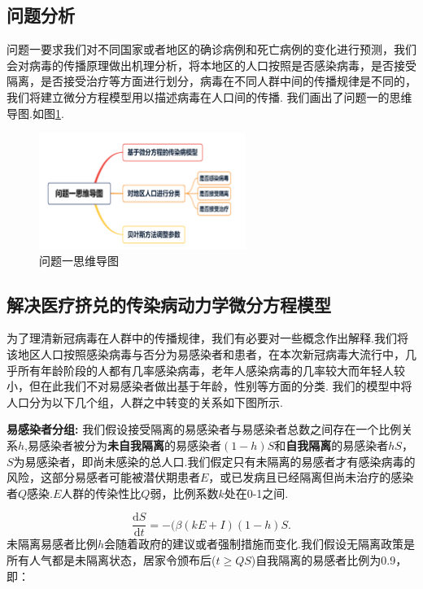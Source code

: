 \documentclass{whutmod}
\newcommand{\upcite}[1]{\textsuperscript{\textsuperscript{\cite{#1}}}}
\begin{document}
\subsection{问题分析}
问题一要求我们对不同国家或者地区的确诊病例和死亡病例的变化进行预测，我们会对病毒的传播原理做出机理分析，将本地区的人口按照是否感染病毒，是否接受隔离，是否接受治疗等方面进行划分，病毒在不同人群中间的传播规律是不同的，我们将建立微分方程模型用以描述病毒在人口间的传播.
我们画出了问题一的思维导图.如图\ref{mindmap1}.
\begin{figure}[!htbp]
	\centering
	\includegraphics[width=0.6\textwidth]{mindmap1.png}
	\caption{问题一思维导图}
	\label{mindmap1}
\end{figure} 

\subsection{解决医疗挤兑的传染病动力学微分方程模型}
  为了理清新冠病毒在人群中的传播规律，我们有必要对一些概念作出解释.我们将该地区人口按照感染病毒与否分为易感染者和患者，在本次新冠病毒大流行中，几乎所有年龄阶段的人都有几率感染病毒，老年人感染病毒的几率较大而年轻人较小，但在此我们不对易感染者做出基于年龄，性别等方面的分类.
我们的模型中将人口分为以下几个组，人群之中转变的关系如下图所示.



\textbf{易感染者分组:}
我们假设接受隔离的易感染者与易感染者总数之间存在一个比例关系$h$,易感染者被分为\textbf{未自我隔离}的易感染者$(1-h)S$和\textbf{自我隔离}的易感染者$hS$，$S$为易感染者，即尚未感染的总人口.我们假定只有未隔离的易感者才有感染病毒的风险，这部分易感者可能被潜伏期患者$E$，或已发病且已经隔离但尚未治疗的感染者$Q$感染.$E$人群的传染性比$Q$弱，比例系数$k$处在0-1之间.

\begin{equation}
	\frac{\mathrm{d}S}{\mathrm{d}t}=-(\beta(kE+I)(1-h)S.
\end{equation}
未隔离易感者比例$h$会随着政府的建议或者强制措施而变化.我们假设无隔离政策是所有人气都是未隔离状态，居家令颁布后($t \ge QS$)自我隔离的易感者比例为0.9，即：
\end{document}
